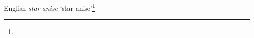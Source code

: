 \begin{etymology}\label{ety:star anise}
English \textit{star anise} `star anise'\footnote{}
\end{etymology}